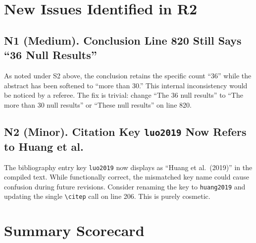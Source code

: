 \documentclass[12pt,a4paper]{article}
\begin{document}
\section*{New Issues Identified in R2}

\subsection*{\textcolor{warncolor}{N1 (Medium). Conclusion Line 820 Still Says ``36 Null Results''}}

As noted under S2 above, the conclusion retains the specific count ``36'' while the abstract has been softened to ``more than 30.'' This internal inconsistency would be noticed by a referee. The fix is trivial: change ``The 36 null results'' to ``The more than 30 null results'' or ``These null results'' on line 820.


\subsection*{N2 (Minor). Citation Key \texttt{luo2019} Now Refers to Huang et al.}

The bibliography entry key \texttt{luo2019} now displays as ``Huang et al.\ (2019)'' in the compiled text. While functionally correct, the mismatched key name could cause confusion during future revisions. Consider renaming the key to \texttt{huang2019} and updating the single \texttt{\textbackslash citep} call on line 206. This is purely cosmetic.


\section*{Summary Scorecard}
\end{document}

